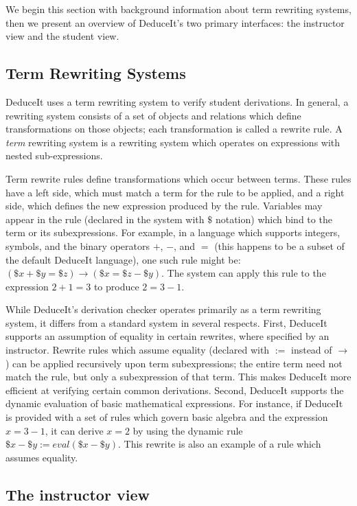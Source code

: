 \documentclass{sigchi}
\begin{document}
We begin this section with background information about term rewriting systems, then we present an overview of DeduceIt's two primary interfaces: the instructor view and the student view.

\subsection{Term Rewriting Systems}

DeduceIt uses a term rewriting system to verify student derivations. In general, a rewriting system consists of a set of objects and relations which define transformations on those objects; each transformation is called a rewrite rule. A \textit{term} rewriting system is a rewriting system which operates on expressions with nested sub-expressions.

Term rewrite rules define transformations which occur between terms. These rules have a left side, which must match a term for the rule to be applied, and a right side, which defines the new expression produced by the rule. Variables may appear in the rule (declared in the system with $\$$ notation) which bind to the term or its subexpressions. For example, in a language which supports integers, symbols, and the binary operators $+$, $-$, and $=$ (this happens to be a subset of the default DeduceIt language), one such rule might be: $(\$x+\$y=\$z) \rightarrow (\$x=\$z-\$y)$. The system can apply this rule to the expression $2+1=3$ to produce $2=3-1$.

While DeduceIt's derivation checker operates primarily as a term rewriting system, it differs from a standard system in several respects. First, DeduceIt supports an assumption of equality in certain rewrites, where specified by an instructor. Rewrite rules which assume equality (declared with $:=$ instead of $\rightarrow$) can be applied recursively upon term subexpressions; the entire term need not match the rule, but only a subexpression of that term. This makes DeduceIt more efficient at verifying certain common derivations. Second, DeduceIt supports the dynamic evaluation of basic mathematical expressions. For instance, if DeduceIt is provided with a set of rules which govern basic algebra and the expression $x=3-1$, it can derive $x=2$ by using the dynamic rule $\$x-\$y := eval(\$x-\$y)$. This rewrite is also an example of a rule which assumes equality.

\subsection{The instructor view}
\end{document}
